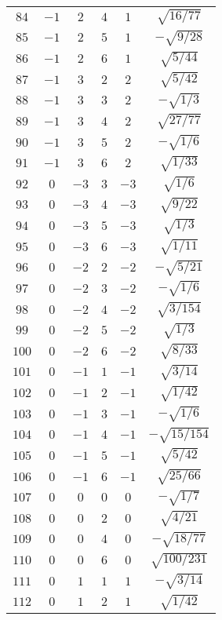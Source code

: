 \begin{table}
\begin{center}
\begin{tabular}{|c|c|c|c|c|c|}
$84$ & $-1$ & $2$ & $4$ & $1$ & $\sqrt{16/77}$ \\ 
$85$ & $-1$ & $2$ & $5$ & $1$ & $-\sqrt{9/28}$ \\ 
$86$ & $-1$ & $2$ & $6$ & $1$ & $\sqrt{5/44}$ \\ 
$87$ & $-1$ & $3$ & $2$ & $2$ & $\sqrt{5/42}$ \\ 
$88$ & $-1$ & $3$ & $3$ & $2$ & $-\sqrt{1/3}$ \\ 
$89$ & $-1$ & $3$ & $4$ & $2$ & $\sqrt{27/77}$ \\ 
$90$ & $-1$ & $3$ & $5$ & $2$ & $-\sqrt{1/6}$ \\ 
$91$ & $-1$ & $3$ & $6$ & $2$ & $\sqrt{1/33}$ \\ 
$92$ & $0$ & $-3$ & $3$ & $-3$ & $\sqrt{1/6}$ \\ 
$93$ & $0$ & $-3$ & $4$ & $-3$ & $\sqrt{9/22}$ \\ 
$94$ & $0$ & $-3$ & $5$ & $-3$ & $\sqrt{1/3}$ \\ 
$95$ & $0$ & $-3$ & $6$ & $-3$ & $\sqrt{1/11}$ \\ 
$96$ & $0$ & $-2$ & $2$ & $-2$ & $-\sqrt{5/21}$ \\ 
$97$ & $0$ & $-2$ & $3$ & $-2$ & $-\sqrt{1/6}$ \\ 
$98$ & $0$ & $-2$ & $4$ & $-2$ & $\sqrt{3/154}$ \\ 
$99$ & $0$ & $-2$ & $5$ & $-2$ & $\sqrt{1/3}$ \\ 
$100$ & $0$ & $-2$ & $6$ & $-2$ & $\sqrt{8/33}$ \\ 
$101$ & $0$ & $-1$ & $1$ & $-1$ & $\sqrt{3/14}$ \\ 
$102$ & $0$ & $-1$ & $2$ & $-1$ & $\sqrt{1/42}$ \\ 
$103$ & $0$ & $-1$ & $3$ & $-1$ & $-\sqrt{1/6}$ \\ 
$104$ & $0$ & $-1$ & $4$ & $-1$ & $-\sqrt{15/154}$ \\ 
$105$ & $0$ & $-1$ & $5$ & $-1$ & $\sqrt{5/42}$ \\ 
$106$ & $0$ & $-1$ & $6$ & $-1$ & $\sqrt{25/66}$ \\ 
$107$ & $0$ & $0$ & $0$ & $0$ & $-\sqrt{1/7}$ \\ 
$108$ & $0$ & $0$ & $2$ & $0$ & $\sqrt{4/21}$ \\ 
$109$ & $0$ & $0$ & $4$ & $0$ & $-\sqrt{18/77}$ \\ 
$110$ & $0$ & $0$ & $6$ & $0$ & $\sqrt{100/231}$ \\ 
$111$ & $0$ & $1$ & $1$ & $1$ & $-\sqrt{3/14}$ \\ 
$112$ & $0$ & $1$ & $2$ & $1$ & $\sqrt{1/42}$ \\ 

\end{tabular}
\end{center}
\end{table}
